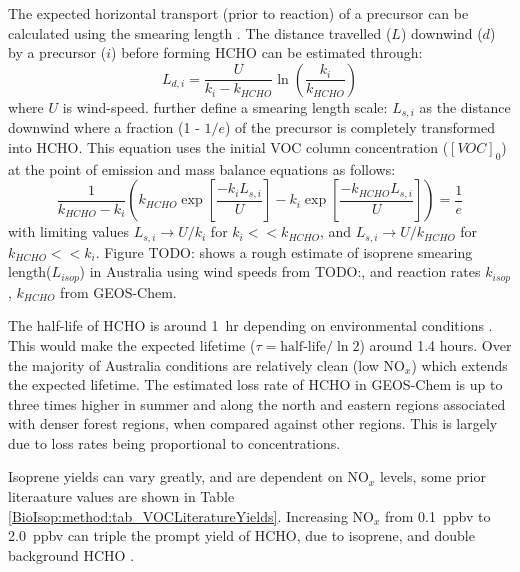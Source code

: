       The expected horizontal transport (prior to reaction) of a precursor can be calculated using the smearing length \parencite{Palmer2003}.
      The distance travelled ($L$) downwind ($d$) by a precursor ($i$) before forming HCHO can be estimated through:
      \begin{equation*}
        L_{d,i} = \frac{U}{k_i - k_{HCHO}} \ln{ \left( \frac{k_i}{k_{HCHO}} \right) }
      \end{equation*}
      where $U$ is wind-speed.
      \textcite{Palmer2003} further define a smearing length scale: $L_{s,i}$ as the distance downwind where a fraction (1 - $1/e$) of the precursor is completely transformed into HCHO.
      This equation uses the initial VOC column concentration ($[VOC]_0$) at the point of emission and mass balance equations as follows:
      \begin{equation}
      \frac{1}{k_{HCHO}-k_i} \left( k_{HCHO} \exp{ \left[ \frac{-k_i L_{s,i}}{U} \right]} -k_i \exp{ \left[ \frac{-k_{HCHO} L_{s,i}}{U} \right]} \right) = \frac{1}{e} 
      \end{equation}
      with limiting values $L_{s,i} \rightarrow U/k_i$ for $k_i << k_{HCHO}$, and $L_{s,i} \rightarrow U/k_{HCHO}$ for $k_{HCHO} << k_i$.
      Figure TODO: shows a rough estimate of isoprene smearing length($L_{isop}$) in Australia using wind speeds from TODO:, and reaction rates $k_{isop}$, $k_{HCHO}$ from GEOS-Chem.
      
      The half-life of HCHO %
      is around 1~hr depending on environmental conditions \parencite{WHO_hcho_guidelines_2010}.
      This would make the expected lifetime ($\tau = \text{half-life}/\ln{2}$) around 1.4 hours.
      Over the majority of Australia conditions are relatively clean (low NO$_x$) which extends the expected lifetime.
      The estimated loss rate of HCHO in GEOS-Chem %
      is up to three times higher in summer and along the north and eastern regions associated with denser forest regions, when compared against other regions.
      This is largely due to loss rates being proportional to concentrations.
      
      Isoprene yields can vary greatly, and are dependent on NO$_x$ levels, some prior literaature values are shown in Table \ref{BioIsop:method:tab_VOCLiteratureYields}.
      Increasing NO$_x$ from 0.1~ppbv to 2.0~ppbv can triple the prompt yield of HCHO, %
      due to isoprene, and double background HCHO \parencite{Wolfe2016}.
      
